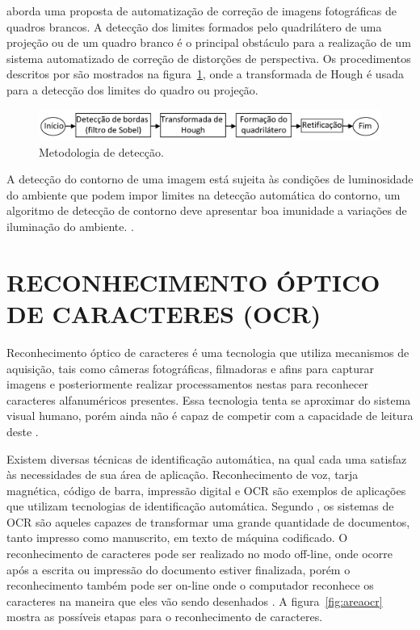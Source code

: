 aborda uma proposta de automatização de correção de imagens fotográficas de quadros brancos. A detecção dos limites formados pelo quadrilátero de uma projeção ou de um quadro branco é o principal obstáculo para a realização de um sistema automatizado de correção de distorções de perspectiva. Os procedimentos descritos por  são mostrados na figura~\ref{fig:metodologiacorrecao}, onde a transformada de Hough é usada para a detecção dos limites do quadro ou projeção.

 \begin{figure}[h]
	\centering
	\includegraphics[width=1.0\textwidth]{Imagens/metodologiacorrecao} 
	\caption[Metodologia de detecção.]{Metodologia de detecção.}
	\label{fig:metodologiacorrecao}
\end{figure}

A detecção do contorno de uma imagem está sujeita às condições de luminosidade do ambiente que podem impor limites na detecção automática do contorno, um algoritmo de detecção de contorno deve apresentar boa imunidade a variações de iluminação do ambiente. \cite{Pereira}.


\section{RECONHECIMENTO ÓPTICO DE CARACTERES (OCR)}
Reconhecimento óptico de caracteres é uma tecnologia que utiliza mecanismos de aquisição, tais como câmeras fotográficas, filmadoras e afins para capturar imagens e posteriormente realizar processamentos nestas para reconhecer caracteres alfanuméricos presentes. Essa tecnologia tenta se aproximar do sistema visual humano, porém ainda não é capaz de competir com a capacidade de leitura deste \cite{Mithe2013}.

 Existem diversas técnicas de identificação automática, na qual cada uma satisfaz às necessidades de sua área de aplicação. Reconhecimento de voz, tarja magnética, código de barra, impressão digital e OCR são exemplos de aplicações que utilizam tecnologias de identificação automática. Segundo , os sistemas de OCR são aqueles capazes de transformar uma grande quantidade de documentos, tanto impresso como manuscrito, em texto de máquina codificado. O reconhecimento de caracteres pode ser realizado no modo off-line, onde ocorre após a escrita ou impressão do documento estiver finalizada, porém o reconhecimento também pode ser on-line onde o computador reconhece os caracteres na maneira que eles vão sendo desenhados \cite{Eikvil1993}. A figura~\ref{fig:areaocr} mostra as possíveis etapas para o reconhecimento de caracteres.

